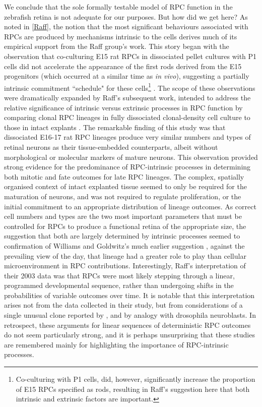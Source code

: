 \documentclass{ut-thesis}
\begin{document}
\begin{NoHyper}
We conclude that the sole formally testable model of RPC function in the zebrafish retina is not adequate for our purposes. But how did we get here? As noted in \autoref{Raff}, the notion that the most significant behaviours associated with RPCs are produced by mechanisms intrinsic to the cells derives much of its empirical support from the Raff group's work. This story began with the observation that co-culturing E15 rat RPCs in dissociated pellet cultures with P1 cells did not accelerate the appearance of the first rods derived from the E15 progenitors (which occurred at a similar time as \textit{in vivo}), suggesting a partially intrinsic commitment ``schedule" for these cells\footnote{Co-culturing with P1 cells, did, however, significantly increase the proportion of E15 RPCs specified as rods, resulting in Raff's suggestion here that both intrinsic and extrinsic factors are important.} \cite{Watanabe1990}. The scope of these observations were dramatically expanded by Raff's subsequent work, intended to address the relative significance of intrinsic versus extrinsic processes in RPC function by comparing clonal RPC lineages in fully dissociated clonal-density cell culture to those in intact explants \cite{Cayouette2003}. The remarkable finding of this study was that dissociated E16-17 rat RPC lineages produce very similar numbers and types of retinal neurons as their tissue-embedded counterparts, albeit without morphological or molecular markers of mature neurons. This observation provided strong evidence for the predominance of RPC-intrinsic processes in determining both mitotic and fate outcomes for late RPC lineages. The complex, spatially organised context of intact explanted tissue seemed to only be required for the maturation of neurons, and was not required to regulate proliferation, or the initial commitment to an appropriate distribution of lineage outcomes. As correct cell numbers and types are the two most important parameters that must be controlled for RPCs to produce a functional retina of the appropriate size, the suggestion that both are largely determined by intrinsic processes seemed to confirmation of Williams and Goldwitz's much earlier suggestion \cite{Williams1992}, against the prevailing view of the day, that lineage had a greater role to play than cellular microenvironment in RPC contributions. Interestingly, Raff's interpretation of their 2003 data was that RPCs were most likely stepping through a linear, programmed developmental sequence, rather than undergoing shifts in the probabilities of variable outcomes over time. It is notable that this interpretation arises not from the data collected in their study, but from considerations of a single unusual clone reported by \cite{Turner1990}, and by analogy with drosophila neuroblasts. In retrospect, these arguments for linear sequences of deterministic RPC outcomes do not seem particularly strong, and it is perhaps unsurprising that these studies are remembered mainly for highlighting the importance of RPC-intrinsic processes.


\end{NoHyper}
\end{document}
